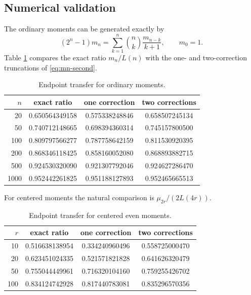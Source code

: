 \documentclass[11pt,oneside]{article}
\theoremstyle{definition}
\theoremstyle{remark}
\begin{document}
\subsection{Numerical validation}

The ordinary moments can be generated exactly by
\begin{equation}\label{eq:mn-recurrence}
 (2^n-1)m_n=\sum_{k=1}^{n}\binom nk\frac{m_{n-k}}{k+1},
 \qquad m_0=1.
\end{equation}
Table \ref{tab:ordinary-transfer} compares the exact ratio $m_n/L(n)$ with the
one- and two-correction truncations of \cref{eq:mn-second}.

\begin{table}[ht]
\centering
\caption{Endpoint transfer for ordinary moments.}
\label{tab:ordinary-transfer}
\begin{tabular}{@{}rccc@{}}
\toprule
$n$ & exact ratio & one correction & two corrections\\
\midrule
20   & 0.650564349158 & 0.575338248846 & 0.658507245134\\
50   & 0.740712148665 & 0.698394360314 & 0.745157800500\\
100  & 0.809797566277 & 0.787758642159 & 0.811530920395\\
200  & 0.868346118425 & 0.858160052080 & 0.868893882715\\
500  & 0.924530320090 & 0.921307792046 & 0.924627286470\\
1000 & 0.952442261825 & 0.951188127893 & 0.952465665513\\
\bottomrule
\end{tabular}
\end{table}

For centered moments the natural comparison is
$\mu_{2r}/(2L(4r))$.

\begin{table}[ht]
\centering
\caption{Endpoint transfer for centered even moments.}
\label{tab:centered-transfer}
\begin{tabular}{@{}rccc@{}}
\toprule
$r$ & exact ratio & one correction & two corrections\\
\midrule
10  & 0.516638138954 & 0.334240960496 & 0.558725000470\\
20  & 0.623451024335 & 0.521571821828 & 0.641626320479\\
50  & 0.755044449961 & 0.716320104160 & 0.759255426702\\
100 & 0.834124742928 & 0.817440783081 & 0.835296570356\\
\bottomrule
\end{tabular}
\end{table}
\end{document}
